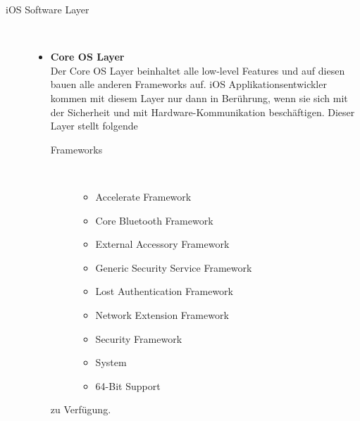 \begin{description}
 	\item[iOS Software Layer]~\par
	\begin{itemize}
	
      		\item \textbf{Core OS Layer} \\
		Der Core OS Layer beinhaltet alle low-level Features und auf diesen bauen alle anderen Frameworks auf. iOS Applikationsentwickler kommen mit diesem Layer nur dann in Berührung, wenn sie sich mit der Sicherheit und mit Hardware-Kommunikation beschäftigen. Dieser Layer stellt folgende
		\begin{description}
			\item[\glqq Frameworks\grqq{}]~\par
			\begin{itemize}
				\item Accelerate Framework
				\item Core Bluetooth Framework
				\item External Accessory Framework
				\item Generic Security Service Framework
				\item Lost Authentication Framework
				\item Network Extension Framework
				\item Security Framework
				\item System
				\item 64-Bit Support
			\end{itemize}
		\end{description}
		zu Verfügung. 
		

\end{itemize}
\end{description}
